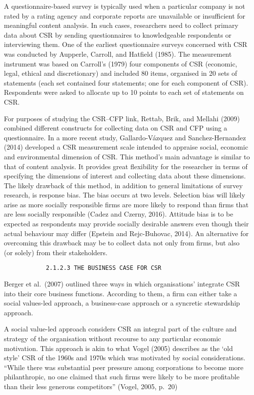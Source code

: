 \documentclass[
]{mitthesis}
\begin{document}
A questionnaire-based survey is typically used when a particular company is not rated by a rating agency and corporate reports are unavailable or insufficient for meaningful content analysis. In such cases, researchers need to collect primary data about CSR by sending questionnaires to knowledgeable respondents or interviewing them. One of the earliest questionnaire surveys concerned with CSR was conducted by Aupperle, Carroll, and Hatfield (1985). The measurement instrument was based on Carroll's (1979) four components of CSR (economic, legal, ethical and discretionary) and included 80 items, organised in 20 sets of statements (each set contained four statements; one for each component of CSR). Respondents were asked to allocate up to 10 points to each set of statements on CSR.

For purposes of studying the CSR--CFP link, Rettab, Brik, and Mellahi (2009) combined different constructs for collecting data on CSR and CFP using a questionnaire. In a more recent study, Gallardo-Vázquez and Sanchez-Hernandez (2014) developed a CSR measurement scale intended to appraise social, economic and environmental dimension of CSR. This method's main advantage is similar to that of content analysis. It provides great flexibility for the researcher in terms of specifying the dimensions of interest and collecting data about these dimensions. The likely drawback of this method, in addition to general limitations of survey research, is response bias. The bias occurs at two levels. Selection bias will likely arise as more socially responsible firms are more likely to respond than firms that are less socially responsible (Cadez and Czerny, 2016). Attitude bias is to be expected as respondents may provide socially desirable answers even though their actual behaviour may differ (Epstein and Rejc-Buhovac, 2014). An alternative for overcoming this drawback may be to collect data not only from firms, but also (or solely) from their stakeholders.

\begin{verbatim}
            2.1.2.3 THE BUSINESS CASE FOR CSR
\end{verbatim}

Berger et al.~(2007) outlined three ways in which organisations' integrate CSR into their core business functions. According to them, a firm can either take a social values-led approach, a business-case approach or a syncretic stewardship approach.

A social value-led approach considers CSR an integral part of the culture and strategy of the organisation without recourse to any particular economic motivation. This approach is akin to what Vogel (2005) describes as the `old style' CSR of the 1960s and 1970s which was motivated by social considerations. ``While there was substantial peer pressure among corporations to become more philanthropic, no one claimed that such firms were likely to be more profitable than their less generous competitors'' (Vogel, 2005, p.~20)
\end{document}
